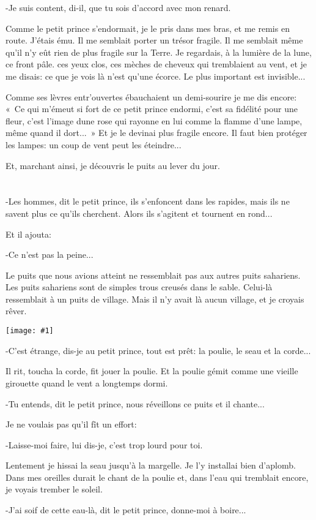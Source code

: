 \documentclass{report}
\newcommand{\parachapter}[2][]{\chapter[#1]{#2}}
\newcommand{\incpic}[1]{%
\begin{center}
    \texttt{[image: \#1]}
\end{center}%
}
\begin{document}
-Je suis content, di-il, que tu sois d'accord avec mon renard.

Comme le petit prince s'endormait, je le pris dans mes bras, et me remis en route. J'étais ému. Il me semblait porter un trésor fragile. Il me semblait même qu'il n'y eût rien de plus fragile sur la Terre. Je regardais, à la lumière de la lune, ce front pâle. ces yeux clos, ces mèches de cheveux qui tremblaient au vent, et je me disais: ce que je vois là n'est qu'une écorce. Le plus important est invisible...

Comme ses lèvres entr'ouvertes ébauchaient un demi-sourire je me dis encore: «~Ce qui m'émeut si fort de ce petit prince endormi, c'est sa fidélité pour une fleur, c'est l'image dune rose qui rayonne en lui comme la flamme d'une lampe, même quand il dort...~» Et je le devinai plus fragile encore. Il faut bien protéger les lampes: un coup de vent peut les éteindre...

Et, marchant ainsi, je découvris le puits au lever du jour.
\parachapter{} %
-Les hommes, dit le petit prince, ils s'enfoncent dans les rapides, mais ils ne savent plus ce qu'ils cherchent. Alors ils s'agitent et tournent en rond...

Et il ajouta:

-Ce n'est pas la peine...

Le puits que nous avions atteint ne ressemblait pas aux autres puits sahariens. Les puits sahariens sont de simples trous creusés dans le sable. Celui-là ressemblait à un puits de village. Mais il n'y avait là aucun village, et je croyais rêver.

\incpic{pic/image41.jpeg}

-C'est étrange, dis-je au petit prince, tout est prêt: la poulie, le seau et la corde...

Il rit, toucha la corde, fit jouer la poulie. Et la poulie gémit comme une vieille girouette quand le vent a longtemps dormi.

-Tu entends, dit le petit prince, nous réveillons ce puits et il chante...

Je ne voulais pas qu'il fît un effort:

-Laisse-moi faire, lui dis-je, c'est trop lourd pour toi.

Lentement je hissai la seau jusqu'à la margelle. Je l'y installai bien d'aplomb. Dans mes oreilles durait le chant de la poulie et, dans l'eau qui tremblait encore, je voyais trember le soleil.

-J'ai soif de cette eau-là, dit le petit prince, donne-moi à boire...
\end{document}

